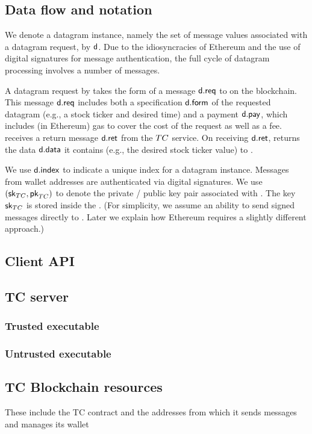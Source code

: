 \subsection{Data flow and notation}

We denote a datagram instance, namely the set of message values associated with a datagram request, by ${\sf d}$. Due to the idiosyncracies of Ethereum and the use of digital signatures for message authentication, the full cycle of datagram processing involves a number of messages. 

A datagram request by \reqcont takes the form of a message ${\sf d.req}$ to \tcont on the blockchain. This message ${\sf d.req}$ includes both a specification ${\sf d.form}$ of the requested datagram (e.g., a stock ticker and desired time) and a payment ${\sf d.pay}$, which includes (in Ethereum) gas to cover the cost of the request as well as a fee. \tcont receives a return message ${\sf d.ret}$ from the $TC$ service. On receiving ${\sf d.ret}$, \tcont returns the data ${\sf d.data}$ it contains (e.g., the desired stock ticker value) to \reqcont. 

We use ${\sf d.index}$ to indicate a unique index for a datagram instance. Messages from wallet addresses are authenticated via digital signatures. We use $({{\sf sk}_{TC}}, {\sf pk}_{TC})$ to denote the private / public key pair associated with \tcadd. The key ${{\sf sk}_{TC}}$ is stored inside the \encname. (For simplicity, we assume an ability to send signed messages directly to \tcont. Later we explain how Ethereum requires a slightly different approach.)



\subsection{Client API}
\subsection{TC server}
\subsubsection{Trusted executable}
\subsubsection{Untrusted executable}
\subsection{TC Blockchain resources}
These include the TC contract and the addresses from which it sends messages and manages its wallet

